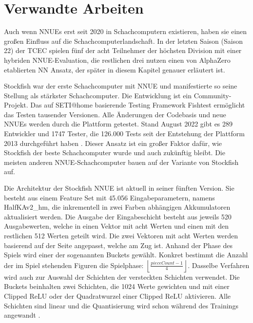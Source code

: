 \chapter{Verwandte Arbeiten}
\label{chap:relatedWork}

Auch wenn \acp{NNUE} erst seit 2020 in Schachcomputern existieren, haben sie einen großen Einfluss auf die Schachcomputerlandschaft. In der letzten Saison (Saison 22) der \ac{TCEC} \cite{TCEC22} spielen fünf der acht Teilnehmer der höchsten Division mit einer hybriden \ac{NNUE}-Evaluation, die restlichen drei nutzen einen von AlphaZero etablierten \ac{NN} Ansatz, der später in diesem Kapitel genauer erläutert ist.


Stockfish war der erste Schachcomputer mit \ac{NNUE} und manifestierte so seine Stellung als stärkster Schachcomputer. Die Entwicklung ist ein Community-Projekt. Das auf SETI@home \cite{SETI2001} basierende Testing Framework Fishtest ermöglicht das Testen tausender Versionen. Alle Änderungen der Codebasis und neue \acp{NNUE} werden durch die Plattform getestet. Stand August 2022 gibt es 289 Entwickler und 1747 Tester, die 126.000 Tests seit der Entstehung der Plattform 2013 durchgeführt haben \cite{FishtestUsers}. Dieser Ansatz ist ein großer Faktor dafür, wie Stockfish der beste Schachcomputer wurde und auch zukünftig bleibt. Die meisten anderen \ac{NNUE}-Schachcomputer bauen auf der Variante von Stockfish auf.
 
Die Architektur der Stockfish \ac{NNUE} ist aktuell in seiner fünften Version. Sie besteht aus einem Feature Set mit 45.056 Eingabeparametern, namens HalfKAv2\_hm, die inkrementell in zwei Farben abhängigen Akkumulatoren aktualisiert werden. Die Ausgabe der Eingabeschicht besteht aus jeweils 520 Ausgabewerten, welche in einen Vektor mit acht Werten und einen mit den restlichen 512 Werten geteilt wird. Die zwei Vektoren mit acht Werten werden basierend auf der Seite angepasst, welche am Zug ist. Anhand der Phase des Spiels wird einer der sogenannten Buckets gewählt. Konkret bestimmt die Anzahl der im Spiel stehenden Figuren die Spielphase: $\left \lfloor\frac{pieceCount-1}{4}\right \rfloor$. Dasselbe Verfahren wird auch zur Auswahl der Schichten der versteckten Schichten verwendet. Die Buckets beinhalten zwei Schichten, die 1024 Werte gewichten und mit einer Clipped \ac{ReLU} oder der Quadratwurzel einer Clipped \ac{ReLU} aktivieren. Alle Schichten sind linear und die Quantisierung wird schon während des Trainings angewandt \cite{StockfishNNUE}.

